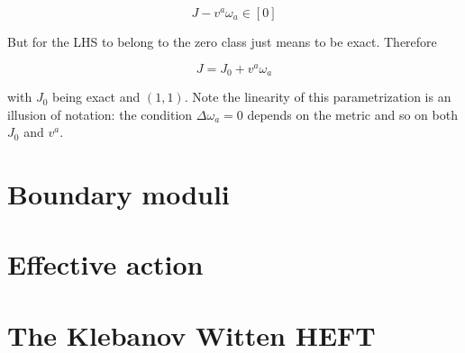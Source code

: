 \begin{equation}
	J - v^a \omega_a \in [0]
\end{equation}

But for the LHS to belong to the zero class just means to be exact. Therefore

\begin{equation}
	J = J_0 + v^a \omega_a \label{JandJ0}
\end{equation}

with $J_0$ being exact and $(1,1)$. Note the linearity of this parametrization is an illusion of notation: the condition $\Delta \omega_a = 0$ depends on the metric and so on both $J_0$ and $v^a$.


\section{Boundary moduli}


\section{Effective action}


\section{The Klebanov Witten HEFT}

